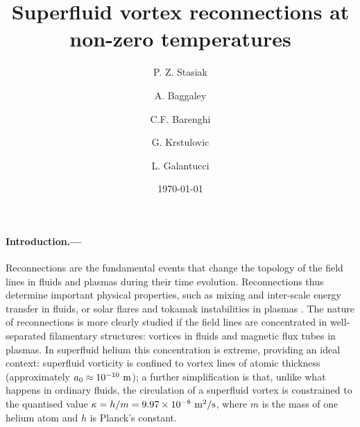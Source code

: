 \documentclass[%
 reprint,
 amsmath,amssymb,
 aps,
 prl,
]{revtex4-2}
\begin{document}

\title{Superfluid vortex reconnections at non-zero temperatures}

\author{P. Z. Stasiak}
\author{A. Baggaley}
\author{C.F. Barenghi}

\author{G. Krstulovic}

\author{L. Galantucci}

\date{\today}%

\begin{abstract}

\end{abstract}

\maketitle

\paragraph*{Introduction.---} Reconnections are the fundamental events that
change the topology of the field lines in fluids and plasmas during their
time evolution. Reconnections
thus determine important physical properties, 
such as mixing and inter-scale energy transfer in fluids, 
or solar flares and tokamak instabilities
in plasmas \cite{Chapman2010}. The nature of reconnections is more clearly
studied if the field lines are concentrated in well-separated
filamentary structures:
vortices in fluids and magnetic flux tubes in plasmas. In superfluid 
helium this concentration is extreme, providing an ideal context:
superfluid vorticity is confined to vortex lines of atomic thickness 
(approximately $a_0 \approx 10^{-10}~\rm m$); a further simplification 
is that, unlike what happens in ordinary fluids, the
circulation of a superfluid vortex  is constrained to the quantised value
$\kappa=h/m=9.97 \times 10^{-8}~\rm m^2/s$, 
where $m$ is the mass of one helium atom and $h$ is Planck's constant. 
\end{document}
